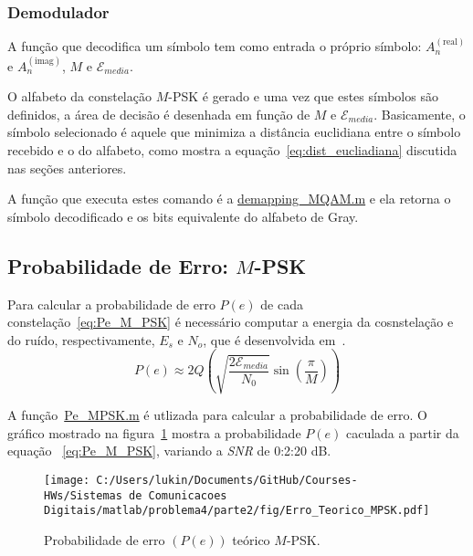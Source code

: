 \subsubsection{Demodulador}

A função que decodifica um símbolo tem como entrada o próprio símbolo: $A_n^{(\text{real})}$ e $A_n^{(\text{imag})}$, $M$ e $\mathcal{E}_{media}$. 

O alfabeto da constelação $M$-PSK é gerado e uma vez que estes símbolos são definidos, a área de decisão é desenhada em função de $M$ e $\mathcal{E}_{media}$. Basicamente, o símbolo selecionado é aquele que minimiza a distância euclidiana entre o símbolo recebido e o do alfabeto, como mostra a equação~\ref{eq:dist_eucliadiana} discutida nas seções anteriores.

A função que executa estes comando é a \href{https://raw.githubusercontent.com/lucasabdalah/Courses-HWs/SCD/Sistemas%20de%20Comunicacoes%20Digitais/matlab/problema1/demapping_MQAM.m}{\colorbox{cyan!10}{demapping\_MQAM.m}} e ela retorna o símbolo decodificado e os bits equivalente do alfabeto de Gray. 

\subsection{Probabilidade de Erro: \texorpdfstring{$M$}{M}-PSK}

Para calcular a probabilidade de erro $P(e)$ de cada constelação~\ref{eq:Pe_M_PSK} é necessário computar a energia da cosnstelação e do ruído, respectivamente, $E_s$ e $N_o$, que é desenvolvida em~\cite{Cecilio}.
\begin{equation}
    P(e) \approx 2Q\left( \sqrt{\frac{2 \mathcal{E}_{media}}{N_0}} \sin\left(\frac{\pi}{M}\right)\right)
    \label{eq:Pe_M_PSK}
\end{equation}

A função~\href{https://raw.githubusercontent.com/lucasabdalah/Courses-HWs/SCD/Sistemas%20de%20Comunicacoes%20Digitais/matlab/problema4/parte2/Pe_MPSK.m}{\colorbox{cyan!10}{Pe\_MPSK.m}} é utlizada para calcular a probabilidade de erro. O gráfico mostrado na figura~\ref{fig:Erro_Teorico_MPSK} mostra a probabilidade $P(e)$ caculada a partir da equação ~\ref{eq:Pe_M_PSK}, variando a \textit{SNR} de 0:2:20 dB.

\begin{figure}[!ht]
    \centering
    \texttt{[image: C:/Users/lukin/Documents/GitHub/Courses-HWs/Sistemas de Comunicacoes Digitais/matlab/problema4/parte2/fig/Erro\_Teorico\_MPSK.pdf]}
    \caption{Probabilidade de erro $(P(e))$ teórico $M$-PSK.}
    \label{fig:Erro_Teorico_MPSK}
\end{figure}

